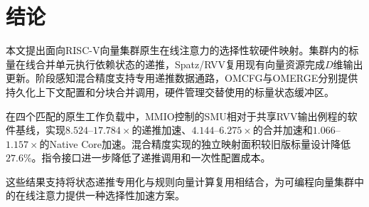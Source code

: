 \documentclass[journal]{IEEEtran}
\begin{document}
\section{结论}
本文提出面向RISC-V向量集群原生在线注意力的选择性软硬件映射。集群内的标量在线合并单元执行依赖状态的递推，Spatz/RVV复用现有向量资源完成$D$维输出更新。阶段感知混合精度支持专用递推数据通路，OMCFG与OMERGE分别提供持久化上下文配置和分块合并调用，硬件管理交替使用的标量状态缓冲区。

在四个匹配的原生工作负载中，MMIO控制的SMU相对于共享RVV输出例程的软件基线，实现$8.524$--$17.784\times$的递推加速、$4.144$--$6.275\times$的合并加速和$1.066$--$1.157\times$的Native Core加速。混合精度实现的独立映射面积较旧版标量设计降低$27.6\%$。指令接口进一步降低了递推调用和一次性配置成本。

这些结果支持将状态递推专用化与规则向量计算复用相结合，为可编程向量集群中的在线注意力提供一种选择性加速方案。

\end{document}
